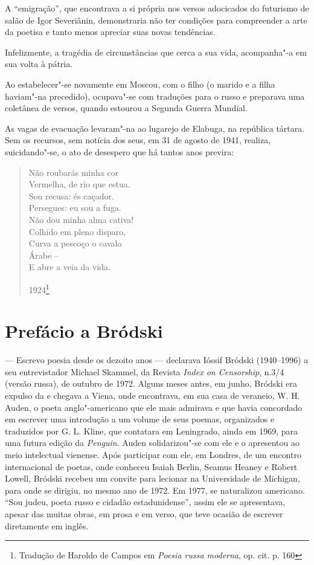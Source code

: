 A ``emigração'', que encontrava a si própria nos versos adocicados do
futurismo de salão de Igor Severiânin, demonstraria não ter condições
para compreender a arte da poetisa e tanto menos apreciar suas novas
tendências.

Infelizmente, a tragédia de circunstâncias que cerca a sua vida,
acompanha"-a em sua volta à pátria.

Ao estabelecer"-se novamente em Moscou, com o filho (o marido e a filha
haviam"-na precedido), ocupava"-se com traduções para o russo e preparava
uma coletânea de versos, quando estourou a Segunda Guerra Mundial.

As vagas de evacuação levaram"-na ao lugarejo de Elabuga, na república
tártara. Sem os recursos, sem notícia dos seus, em 31 de agosto de 1941,
realiza, suicidando"-se, o ato de desespero que há tantos anos previra:

\begin{verse}
Não roubarás minha cor \\
Vermelha, de rio que estua. \\
Sou recusa: és caçador. \\
Persegues: eu sou a fuga. \\[8pt]
Não dou minha alma cativa! \\
Colhido em pleno disparo, \\
Curva a pescoço o cavalo \\
Árabe -- \\
E abre a veia da vida. \\
\begin{flushright}
1924\footnote{Tradução de Haroldo de Campos em \emph{Poesia russa
  moderna}, op. cit. p. 160}
  \end{flushright}
\end{verse}


\chapter{Prefácio a Bródski}

--- Escrevo poesia desde os dezoito anos --- declarava Ióssif Bródski
(1940--1996) a seu entrevistador Michael Skammel, da Revista \emph{Index
on Censorship}, n.3/4 (versão russa), de outubro de 1972. Alguns meses
antes, em junho, Bródski era expulso da  e chegava a Viena, onde
encontrava, em sua casa de veraneio, W. H. Auden, o poeta
anglo"-americano que ele mais admirava e que havia concordado em escrever
uma introdução a um volume de seus poemas, organizados e traduzidos por
G. L. Kline, que contatara em Leningrado, ainda em 1969, para uma
futura edição da \emph{Penguin}. Auden solidarizou"-se com ele e o apresentou ao
meio intelectual vienense. Após participar com ele, em Londres, de um
encontro internacional de poetas, onde conheceu Isaiah Berlin, Seamus
Heaney e Robert Lowell, Bródski recebeu um convite para lecionar na
Universidade de Michigan, para onde se dirigiu, no mesmo ano de 1972. Em
1977, se naturalizou americano. ``Sou judeu, poeta russo e cidadão
estadunidense'', assim ele se apresentava, apesar das muitas obras, em
prosa e em verso, que teve ocasião de escrever diretamente em inglês.

